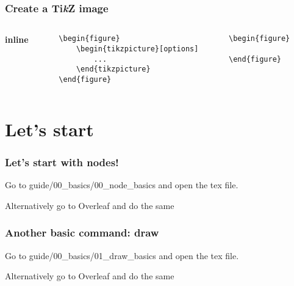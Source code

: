 \documentclass{beamer}
\newcommand{\tikzname}{Ti\textit{k}Z\xspace}
\begin{document}

\begin{frame}
\frametitle{Create a \tikzname image}
\begin{columns}[l] %

\textbf{inline}
\begin{lstlisting}
    \begin{figure}
        \begin{tikzpicture}[options]
            ...
        \end{tikzpicture}
    \end{figure}
\end{lstlisting}

\begin{lstlisting}
    \begin{figure}
        
    \end{figure}
\end{lstlisting}
\end{columns}
\end{frame}

\section{Let's start}

\begin{frame}
    \frametitle{Let's start with nodes!}

    Go to guide/00_basics/00_node_basics and open the tex file.

    Alternatively go to Overleaf and do the same

\end{frame}


\begin{frame}
    \frametitle{Another basic command: draw}

    Go to guide/00_basics/01_draw_basics and open the tex file.

    Alternatively go to Overleaf and do the same

\end{frame}
\end{document}

